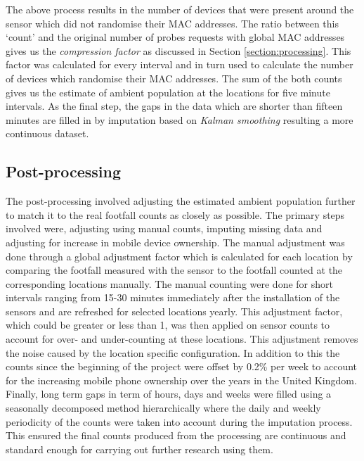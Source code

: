 The above process results in the number of devices that were present around the sensor which did not randomise their MAC addresses. 
The ratio between this `count' and the original number of probes requests with global MAC addresses gives us the \textit{compression factor} as discussed in Section \ref{section:processing}.
This factor was calculated for every interval and in turn used to calculate the number of devices which randomise their MAC addresses.
The sum of the both counts gives us the estimate of ambient population at the locations for five minute intervals.
As the final step, the gaps in the data which are shorter than fifteen minutes are filled in by imputation based on \textit{Kalman smoothing} resulting a more continuous dataset.

\subsection{Post-processing}
The post-processing involved adjusting the estimated ambient population further to match it to the real footfall counts as closely as possible.
The primary steps involved were, adjusting using manual counts, imputing missing data and adjusting for increase in mobile device ownership.
The manual adjustment was done through a global adjustment factor which is calculated for each location by comparing the footfall measured with the sensor to the footfall counted at the corresponding locations manually.
The manual counting were done for short intervals ranging from 15-30 minutes immediately after the installation of the sensors and are refreshed for selected locations yearly.
This adjustment factor, which could be greater or less than 1, was then applied on sensor counts to account for over- and under-counting at these locations.
This adjustment removes the noise caused by the location specific configuration.
In addition to this the counts since the beginning of the project were offset by 0.2\% per week to account for the increasing mobile phone ownership over the years in the United Kingdom\cite{deloitte2018}.
Finally, long term gaps in term of hours, days and weeks were filled using a seasonally decomposed method hierarchically where the daily and weekly periodicity of the counts were taken into account during the imputation process.
This ensured the final counts produced from the processing are continuous and standard enough for carrying out further research using them.
